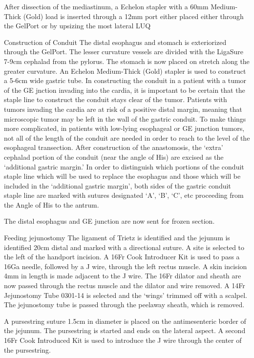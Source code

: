 \documentclass[
]{book}
\begin{document}
After dissection of the mediastinum, a Echelon stapler with a 60mm Medium-Thick (Gold) load is inserted through a 12mm port either placed either through the GelPort or by upsizing the most lateral LUQ

Construction of Conduit
The distal esophagus and stomach is exteriorized through the GelPort. The lesser curvature vessels are divided with the LigaSure 7-9cm cephalad from the pylorus. The stomach is now placed on stretch along the greater curvature. An Echelon Medium-Thick (Gold) stapler is used to construct a 5-6cm wide gastric tube. In constructing the conduit in a patient with a tumor of the GE jnction invading into the cardia, it is important to be certain that the staple line to construct the conduit stays clear of the tumor. Patients with tumors invading the cardia are at risk of a positive distal margin, meaning that microscopic tumor may be left in the wall of the gastric conduit. To make things more complicated, in patients with low-lying esophageal or GE junction tumors, not all of the length of the conduit are needed in order to reach to the level of the esophageal transection. After construction of the anastomosis, the `extra' cephalad portion of the conduit (near the angle of His) are excised as the `additional gastric margin.' In order to distinguish which portions of the conduit staple line which will be used to replace the esophagus and those which will be included in the `additional gastric margin', both sides of the gastric conduit staple line are marked with sutures designated `A', `B', `C', etc proceeding from the Angle of His to the antrum.

The distal esophagus and GE junction are now sent for frozen section.

Feeding jejunostomy
The ligament of Trietz is identified and the jejunum is identified 20cm distal and marked with a directional suture. A site is selected to the left of the handport incision. A 16Fr Cook Introducer Kit is used to pass a 16Ga needle, followed by a J wire, through the left rectus muscle. A skin incision 4mm in length is made adjacent to the J wire. The 16Fr dilator and sheath are now passed through the rectus muscle and the dilator and wire removed. A 14Fr Jejunostomy Tube 0301-14 is selected and the `wings' trimmed off with a scalpel. The jejunostomy tube is passed through the peelaway sheath, which is removed.

A pursestring suture 1.5cm in diameter is placed on the antimesenteric border of the jejunum. The pursestring is started and ends on the lateral aspect. A second 16Fr Cook Introduced Kit is used to introduce the J wire through the center of the pursestring.
\end{document}

